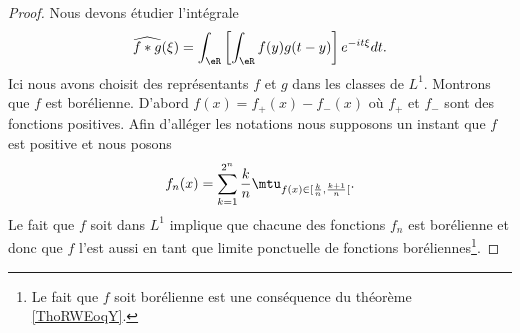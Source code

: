 \begin{proof}
    Nous devons étudier l'intégrale
    \begin{equation}
        \widehat{f*g}(\xi)=\int_{\eR}\left[ \int_{\eR} f(y)g(t-y)\right] e^{-it\xi} dt.
    \end{equation}
    Ici nous avons choisit des représentants \( f\) et \( g\) dans les classes de \( L^1\). Montrons que \( f\) est borélienne. D'abord \( f(x)=f_+(x)-f_-(x)\) où \( f_+\) et \( f_-\) sont des fonctions positives. Afin d'alléger les notations nous supposons un instant que \( f\) est positive et nous posons
    \begin{equation}
        f_n(x)=\sum_{k=1}^{2^n} \frac{ k }{ n }\mtu_{f(x)\in\mathopen[ \frac{ k }{ n } , \frac{ k+1 }{ n } [}.
    \end{equation}
    Le fait que \( f\) soit dans \( L^1\) implique que chacune des fonctions \( f_n\) est borélienne et donc que \( f\) l'est aussi en tant que limite ponctuelle de fonctions boréliennes\footnote{Le fait que \( f\) soit borélienne est une conséquence du théorème \ref{ThoRWEoqY}.}.
    

\end{proof}
